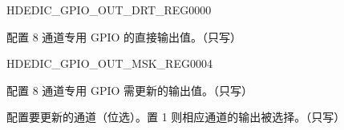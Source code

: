 \begin{register}{H}{DEDIC\_GPIO\_OUT\_DRT\_REG}{\hexprefix{}0000}\label{regdesc:DEDICGPIOOUTDRTREG}
%
%
\regnewline%
\begin{regdesc}\begin{reglist}
\label{fielddesc:DEDICGPIOOUTDRTVLAUE}\item [DEDIC\_GPIO\_OUT\_DRT\_VLAUE] 配置 8 通道专用 GPIO 的直接输出值。（只写）
\end{reglist}\end{regdesc}
\end{register}

\begin{register}{H}{DEDIC\_GPIO\_OUT\_MSK\_REG}{\hexprefix{}0004}\label{regdesc:DEDICGPIOOUTMSKREG}
%
%
%
\regnewline%
\begin{regdesc}\begin{reglist}
\label{fielddesc:DEDICGPIOOUTVALUE}\item [DEDIC\_GPIO\_OUT\_VALUE] 配置 8 通道专用 GPIO 需更新的输出值。（只写）
\label{fielddesc:DEDICGPIOOUTMSK}\item [DEDIC\_GPIO\_OUT\_MSK] 配置要更新的通道（位选）。置 1 则相应通道的输出被选择。（只写）
\end{reglist}\end{regdesc}
\end{register}

